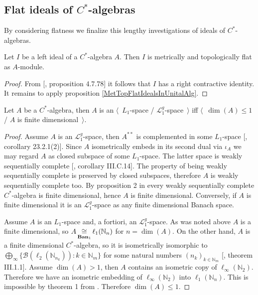 \subsection{Flat ideals of \texorpdfstring{$C^*$}{C*}-algebras}
\label{SubSectionFlatIdealsOfCStarAlgebras}

By considering flatness we finalize this lengthy investigations of ideals of $C^*$-algebras.

\begin{proposition}\label{IdealofCstarAlgisMetTopFlat} Let $I$ be a left ideal of a $C^*$-algebra $A$. Then $I$ is metrically and topologically flat as $A$-module.
\end{proposition}
\begin{proof} From [\cite{HelBanLocConvAlg}, proposition 4.7.78] it follows that $I$ has a right contractive identity. It remains to apply proposition \ref{MetTopFlatIdealsInUnitalAlg}.
\end{proof}

\begin{proposition}\label{CStarAlgIsL1IfFinDim} Let $A$ be a $C^*$-algebra, then $A$ is an $\langle$~$L_1$-space / $\mathscr{L}_1^g$-space~$\rangle$ iff $\langle$~$\operatorname{dim}(A)\leq 1$ / $A$ is finite dimensional~$\rangle$.
\end{proposition}
\begin{proof} Assume $A$ is an $\mathscr{L}_1^g$-space, then $A^{**}$ is complemented in some $L_1$-space [\cite{DefFloTensNorOpId}, corollary 23.2.1(2)]. Since $A$ isometrically embeds in its second dual via $\iota_{A}$ we may regard $A$ as closed subspace of some $L_1$-space. The latter space is weakly sequentially complete [\cite{WojBanSpForAnalysts}, corollary III.C.14]. The property of being weakly sequentially complete is preserved by closed subspaces, therefore $A$ is weakly sequentially complete too. By proposition 2 in \cite{SakWeakCompOpOnOpAlg} every weakly sequentially complete $C^*$-algebra is finite dimensional, hence $A$ is finite dimensional. Conversely, if $A$ is finite dimensional it is an $\mathscr{L}_1^g$-space as any finite dimensional Banach space.

Assume $A$ is an $L_1$-space and, a fortiori, an $\mathscr{L}_1^g$-space. As was noted above $A$ is a finite dimensional, so $A\mathop{\mathbin{\cong}}\limits_{\mathbf{Ban}_1}\ell_1(\mathbb{N}_n)$ for $n=\operatorname{dim}(A)$. On the other hand, $A$ is a finite dimensional $C^*$-algebra, so it is isometrically isomorphic to $\bigoplus_\infty\{ \mathcal{B}(\ell_2(\mathbb{N}_{n_k})):k\in\mathbb{N}_m\}$ for some natural numbers $(n_k)_{k\in\mathbb{N}_m}$ [\cite{DavCSatrAlgByExmpl}, theorem III.1.1]. Assume $\operatorname{dim}(A)>1$, then $A$ contains an isometric copy of $\ell_\infty(\mathbb{N}_2)$. Therefore we have an isometric embedding of $\ell_\infty(\mathbb{N}_2)$ into $\ell_1(\mathbb{N}_n)$. This is impossible by theorem 1 from \cite{LyubIsomEmdbFinDimLp}. Therefore $\operatorname{dim}(A)\leq 1$. 
\end{proof}

